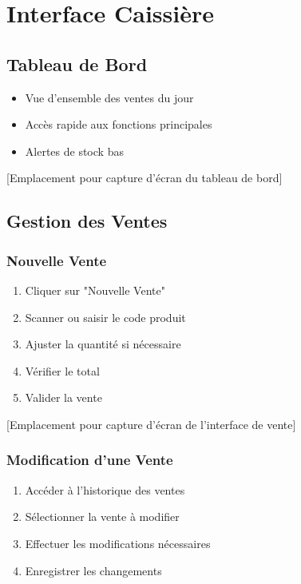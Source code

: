 \documentclass[14pt,a4paper]{report}
\begin{document}
\chapter{Interface Caissière}

\section{Tableau de Bord}
\begin{itemize}
    \item Vue d'ensemble des ventes du jour
    \item Accès rapide aux fonctions principales
    \item Alertes de stock bas
\end{itemize}

[Emplacement pour capture d'écran du tableau de bord]

\section{Gestion des Ventes}
\subsection{Nouvelle Vente}
\begin{enumerate}
    \item Cliquer sur "Nouvelle Vente"
    \item Scanner ou saisir le code produit
    \item Ajuster la quantité si nécessaire
    \item Vérifier le total
    \item Valider la vente
\end{enumerate}

[Emplacement pour capture d'écran de l'interface de vente]

\subsection{Modification d'une Vente}
\begin{enumerate}
    \item Accéder à l'historique des ventes
    \item Sélectionner la vente à modifier
    \item Effectuer les modifications nécessaires
    \item Enregistrer les changements
\end{enumerate}
\end{document}
